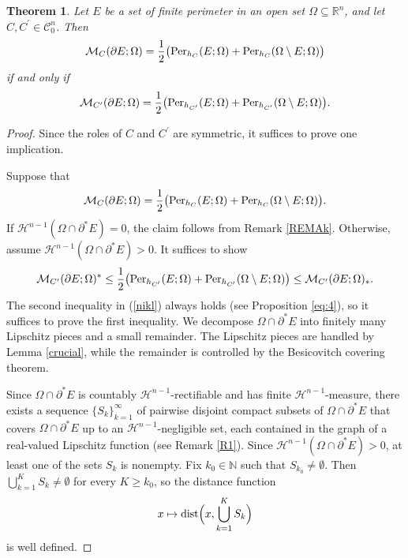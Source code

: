 \documentclass[pdflatex,sn-mathphys-num]{sn-jnl}
\theoremstyle{plain}
\newtheorem{theorem}{Theorem}[section]
\theoremstyle{definition}
\DeclareMathOperator{\dist}{\textup{dist}}
\begin{document}
\begin{theorem}
\label{theoremExistence}
Let $E$ be a set of finite perimeter in an open set $\Omega\subseteq\mathbb{R}^n$, and let $C, C^{\prime}\in\mathcal{C}^n_0$. Then
\[
\mathcal{M}_C(\partial E; \Omega)=\frac{1}{2}\big(\textup{Per}_{h_{C}}(E; \Omega)+\textup{Per}_{h_{C}}(\Omega\setminus E; \Omega)\big)
\]
if and only if
\[
\mathcal{M}_{C^{\prime}}(\partial E; \Omega)=\frac{1}{2}\big(\textup{Per}_{h_{C^{\prime}}}(E; \Omega)+\textup{Per}_{h_{C^{\prime}}}(\Omega\setminus E; \Omega)\big). 
\]
\end{theorem}
\begin{proof}
Since the roles of $C$ and $C^{\prime}$ are symmetric, it suffices to prove one implication.

Suppose that
\[
\mathcal{M}_C(\partial E; \Omega)=\frac{1}{2}\big(\textup{Per}_{h_{C}}(E; \Omega)+\textup{Per}_{h_{C}}(\Omega\setminus E; \Omega)\big).
\]
If $\mathcal{H}^{n-1}(\Omega\cap\partial^*E)=0$, the claim follows from Remark \ref{REMAk}. Otherwise, assume $\mathcal{H}^{n-1}(\Omega\cap\partial^*E)>0$. It suffices to show
\begin{align}\label{nikl}
\mathcal{M}_{C^{\prime}}(\partial E; \Omega)^*\leq\frac{1}{2}\big(\textup{Per}_{h_{C^{\prime}}}(E; \Omega)+\textup{Per}_{h_{C^{\prime}}}(\Omega\setminus E; \Omega)\big)\leq \mathcal{M}_{C^{\prime}}(\partial E; \Omega)_*.
\end{align}
The second inequality in (\ref{nikl}) always holds (see Proposition \ref{eq:4}), so it suffices to prove the first inequality. We decompose $\Omega\cap\partial^*E$ into finitely many Lipschitz pieces and a small remainder. The Lipschitz pieces are handled by Lemma \ref{crucial}, while the remainder is controlled by the Besicovitch covering theorem.

Since $\Omega\cap\partial^* E$ is countably $\mathcal{H}^{n-1}$-rectifiable and has finite $\mathcal{H}^{n-1}$-measure, there exists a sequence $\{S_k\}_{k=1}^{\infty}$ of pairwise disjoint compact subsets of $\Omega\cap\partial^* E$ that covers $\Omega\cap\partial^* E$ up to an $\mathcal{H}^{n-1}$-negligible set, each contained in the graph of a real-valued Lipschitz function (see Remark \ref{R1}). Since $\mathcal{H}^{n-1}(\Omega\cap\partial^* E)>0$, at least one of the sets $S_k$ is nonempty. Fix $k_0\in\mathbb{N}$ such that $S_{k_0}\neq\emptyset$. Then $\bigcup_{k=1}^K S_k\neq\emptyset$ for every $K\geq k_0$, so the distance function
\[
x\mapsto \dist\Bigl(x,\bigcup_{k=1}^K S_k\Bigr)
\]
is well defined.


\end{proof}
\end{document}
